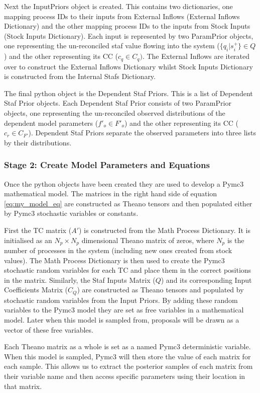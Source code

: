 \documentclass[ %
                    author={Tom Jager},
                supervisor={Dr. Daniel Schien},
                    degree={MEng},
                     title={A Bayesian Inference Engine for UMIS Structured Data},
                  subtitle={},
                      type={research},
                      year={2019} ]{dissertation}
\begin{document}
Next the InputPriors object is created. This contains two dictionaries, one mapping process IDs to their inputs from External Inflows (External Inflows Dictionary) and the other mapping process IDs to the inputs from Stock Inputs (Stock Inputs Dictionary). Each input is represented by two ParamPrior objects, one representing the un-reconciled staf value flowing into the system ($\{q_i | s^+_i\} \in Q$) and the other representing its CC ($c_q \in C_q)$. The External Inflows are iterated over to construct the External Inflows Dictionary whilst Stock Inputs Dictionary is constructed from the Internal Stafs Dictionary.

The final python object is the Dependent Staf Priors. This is a list of Dependent Staf Prior objects. Each Dependent Staf Prior consists of two ParamPrior objects, one representing the un-reconciled observed distributions of the dependent model parameters ($f'_o \in F'_o$) and the other representing its CC ($c_r \in C_{F'}$). Dependent Staf Priors separate the observed parameters into three lists by their distributions.

\subsubsection{Stage 2: Create Model Parameters and Equations}
Once the python objects have been created they are used to develop a Pymc3 mathematical model. The matrices in the right hand side of equation \ref{eq:my_model_eq} are constructed as Theano tensors and then populated either by Pymc3 stochastic variables or constants.

First the TC matrix ($A'$) is constructed from the Math Process Dictionary. It is initialised as an $N_p \times N_p$ dimensional Theano matrix of zeros, where $N_p$ is the number of processes in the system (including new ones created from stock values). The Math Process Dictionary is then used to create the Pymc3 stochastic random variables for each TC and place them in the correct positions in the matrix. Similarly, the Staf Inputs Matrix  ($Q$) and its corresponding Input Coefficients Matrix ($C_Q$) are constructed as Theano tensors and populated by stochastic random variables from the Input Priors. By adding these random variables to the Pymc3 model they are set as free variables in a mathematical model. Later when this model is sampled from, proposals will be drawn as a vector of these free variables.

Each Theano matrix as a whole is set as a named Pymc3 deterministic variable. When this model is sampled, Pymc3 will then store the value of each matrix for each sample. This allows us to extract the posterior samples of each matrix from their variable name and then access specific parameters using their location in that matrix. 
\end{document}
